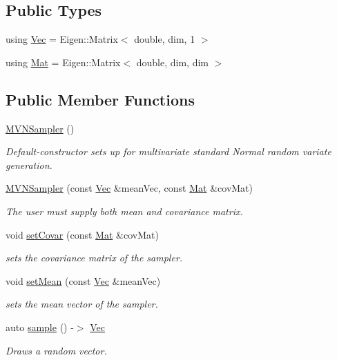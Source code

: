 \subsection*{Public Types}
\begin{DoxyCompactItemize}
\item 
using \hyperlink{classrvsamp_1_1MVNSampler_a07a367332a2524d307ca2ee2c5b670cd}{Vec} = Eigen\+::\+Matrix$<$ double, dim, 1 $>$
\item 
using \hyperlink{classrvsamp_1_1MVNSampler_ae20b2ea3c308b2a687ed667b72ff8bb8}{Mat} = Eigen\+::\+Matrix$<$ double, dim, dim $>$
\end{DoxyCompactItemize}
\subsection*{Public Member Functions}
\begin{DoxyCompactItemize}
\item 
\hyperlink{classrvsamp_1_1MVNSampler_a5f6b5ec9422a7fc761acb52c9c731f59}{M\+V\+N\+Sampler} ()
\begin{DoxyCompactList}\small\item\em Default-\/constructor sets up for multivariate standard Normal random variate generation. \end{DoxyCompactList}\item 
\hyperlink{classrvsamp_1_1MVNSampler_afcdb4f2027acc75e2f25c60ca5335cba}{M\+V\+N\+Sampler} (const \hyperlink{classrvsamp_1_1MVNSampler_a07a367332a2524d307ca2ee2c5b670cd}{Vec} \&mean\+Vec, const \hyperlink{classrvsamp_1_1MVNSampler_ae20b2ea3c308b2a687ed667b72ff8bb8}{Mat} \&cov\+Mat)
\begin{DoxyCompactList}\small\item\em The user must supply both mean and covariance matrix. \end{DoxyCompactList}\item 
void \hyperlink{classrvsamp_1_1MVNSampler_af4e34d4ebe1e24ea924c6cc6ec73e13d}{set\+Covar} (const \hyperlink{classrvsamp_1_1MVNSampler_ae20b2ea3c308b2a687ed667b72ff8bb8}{Mat} \&cov\+Mat)
\begin{DoxyCompactList}\small\item\em sets the covariance matrix of the sampler. \end{DoxyCompactList}\item 
void \hyperlink{classrvsamp_1_1MVNSampler_a0543cc157491cf3d010fc61bff2a965c}{set\+Mean} (const \hyperlink{classrvsamp_1_1MVNSampler_a07a367332a2524d307ca2ee2c5b670cd}{Vec} \&mean\+Vec)
\begin{DoxyCompactList}\small\item\em sets the mean vector of the sampler. \end{DoxyCompactList}\item 
auto \hyperlink{classrvsamp_1_1MVNSampler_aa93725a5a80f572079a0adb0a5bd8e64}{sample} () -\/$>$ \hyperlink{classrvsamp_1_1MVNSampler_a07a367332a2524d307ca2ee2c5b670cd}{Vec}
\begin{DoxyCompactList}\small\item\em Draws a random vector. \end{DoxyCompactList}\end{DoxyCompactItemize}
